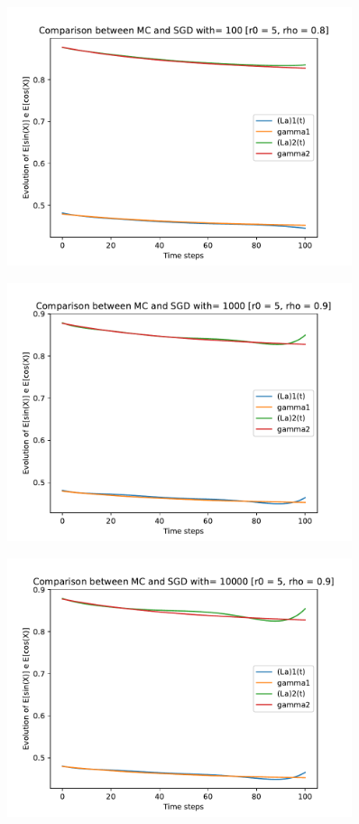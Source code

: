 \documentclass[a4paper,11pt,openright]{report}
\begin{document}
\begin{figure}[H]
\centering
\includegraphics[width=0.9\textwidth]{images/graphics T = 1/n = 6, M = 100 sine and cosine.pdf}
\end{figure}
\begin{figure}[H]
\centering
\includegraphics[width=0.9\textwidth]{images/graphics T = 1/n = 6, M = 1000 sine and cosine.pdf}
\end{figure}
\begin{figure}[H]
\centering
\includegraphics[width=0.9\textwidth]{images/graphics T = 1/n = 6, M = 10000 sine and cosine.pdf}
\end{figure}
\newpage
\end{document}

